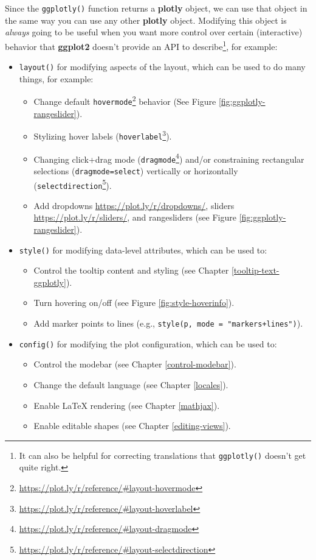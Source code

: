 \documentclass[
  12pt,
]{krantz}
\makeatletter
\providecommand{\tightlist}{%
  \setlength{\itemsep}{0pt}\setlength{\parskip}{0pt}}
\renewcommand{\href}[2]{#2\footnote{\url{#1}}}
\newcommand{\indexc}[1]{\index{#1@\texttt{#1}}}
\makeatother
\begin{document}
Since the \texttt{ggplotly()} function returns a \textbf{plotly} object, we can use that object in the same way you can use any other \textbf{plotly} object. Modifying this object is \emph{always} going to be useful when you want more control over certain (interactive) behavior that \textbf{ggplot2} doesn't provide an API to describe\footnote{It can also be helpful for correcting translations that \texttt{ggplotly()} doesn't get quite right.}, for example:

\indexc{style()}

\begin{itemize}
\tightlist
\item
  \texttt{layout()} for modifying aspects of the layout, which can be used to do many things, for example:

  \begin{itemize}
  \tightlist
  \item
    Change default \href{https://plot.ly/r/reference/\#layout-hovermode}{\texttt{hovermode}} behavior (See Figure \ref{fig:ggplotly-rangeslider}).
  \item
    Stylizing hover labels (\href{https://plot.ly/r/reference/\#layout-hoverlabel}{\texttt{hoverlabel}}).
  \item
    Changing click+drag mode (\href{https://plot.ly/r/reference/\#layout-dragmode}{\texttt{dragmode}}) and/or constraining rectangular selections (\texttt{dragmode=\textquotesingle{}select\textquotesingle{}}) vertically or horizontally (\href{https://plot.ly/r/reference/\#layout-selectdirection}{\texttt{selectdirection}}).
  \item
    Add dropdowns \url{https://plot.ly/r/dropdowns/}, sliders \url{https://plot.ly/r/sliders/}, and rangesliders (see Figure \ref{fig:ggplotly-rangeslider}).
  \end{itemize}
\item
  \texttt{style()} for modifying data-level attributes, which can be used to:

  \begin{itemize}
  \tightlist
  \item
    Control the tooltip content and styling (see Chapter \ref{tooltip-text-ggplotly}).
  \item
    Turn hovering on/off (see Figure \ref{fig:style-hoverinfo}).
  \item
    Add marker points to lines (e.g., \texttt{style(p,\ mode\ =\ "markers+lines")}).
  \end{itemize}
\item
  \texttt{config()} for modifying the plot configuration, which can be used to:

  \begin{itemize}
  \tightlist
  \item
    Control the modebar (see Chapter \ref{control-modebar}).
  \item
    Change the default language (see Chapter \ref{locales}).
  \item
    Enable LaTeX rendering (see Chapter \ref{mathjax}).
  \item
    Enable editable shapes (see Chapter \ref{editing-views}).
  \end{itemize}
\end{itemize}
\end{document}
